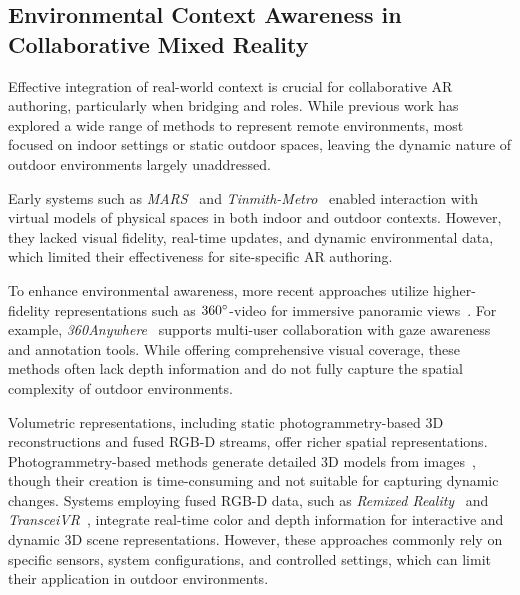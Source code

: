 \subsection{Environmental Context Awareness in Collaborative Mixed Reality}
Effective integration of real-world context is crucial for collaborative AR authoring, particularly when bridging \exsitu and \insitu roles. 
While previous work has explored a wide range of methods to represent remote environments, most focused on indoor settings or static outdoor spaces, leaving the dynamic nature of outdoor environments largely unaddressed.

Early systems such as \textit{MARS}~\cite{hollererExploringMARSDeveloping1999} and \textit{Tinmith-Metro}~\cite{piekarskiTinmithMetroNewOutdoor2001} enabled interaction with virtual models of physical spaces in both indoor and outdoor contexts. However, they lacked visual fidelity, real-time updates, and dynamic environmental data, which limited their effectiveness for site-specific AR authoring.

To enhance environmental awareness, more recent approaches utilize higher-fidelity representations such as $360\degree$-video for immersive panoramic views~\cite{kasaharaJackInHeadImmersive2015,speicher360AnywhereMobileAdhoc2018,teo360DropsMixedReality2019}. For example, \textit{360Anywhere}~\cite{speicher360AnywhereMobileAdhoc2018} supports multi-user collaboration with gaze awareness and annotation tools. While offering comprehensive visual coverage, these methods often lack depth information and do not fully capture the spatial complexity of outdoor environments.

Volumetric representations, including static photogrammetry-based 3D reconstructions and fused RGB-D streams, offer richer spatial representations. Photogrammetry-based methods generate detailed 3D models from images~\cite{gaoRealtimeVisualRepresentations2018,numanExploringUserBehaviour2022, tianUsingVirtualReplicas2023}, though their creation is time-consuming and not suitable for capturing dynamic changes. Systems employing fused RGB-D data, such as \textit{Remixed Reality}~\cite{lindlbauerRemixedRealityManipulating2018} and \textit{TransceiVR}~\cite{thoravikumaravelTransceiVRBridgingAsymmetrical2020}, integrate real-time color and depth information for interactive and dynamic 3D scene representations. However, these approaches commonly rely on specific sensors, system configurations, and controlled settings, which can limit their application in outdoor environments.

